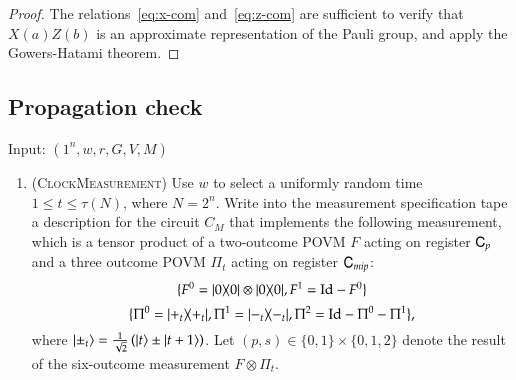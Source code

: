 \begin{proof}
The relations~\eqref{eq:x-com} and~\eqref{eq:z-com} are sufficient to verify that $X(a)Z(b)$ is an approximate representation of the Pauli group, and apply the Gowers-Hatami theorem.
\end{proof}



\subsection{Propagation check}
\label{sec:prop_check}

\vspace{10pt}
\begin{center}
\begin{mdframed}
    Input: $(1^n,w,r,G,V,M)$
	\begin{enumerate}
		\item (\textsc{ClockMeasurement}) Use $w$ to select a uniformly random time $1 \leq t \leq \tau(N)$, where $N = 2^n$. Write into the measurement specification tape a description for the circuit $C_M$ that implements the following measurement, which is a tensor product of a two-outcome POVM $F$ acting on register ${\textsf{C}}_p$ and a three outcome POVM $\Pi_t$ acting on register ${\textsf{C}}_{mip}$: 
\[
	\{F^0 = |0\rangle\! \langle 0| \otimes |0\rangle\! \langle 0|, F^1 = \mathop{\mathrm{Id}}\!\mathinner{} - F^0 \}
\]
\[
	\{ 	\Pi^0 = |+_t\rangle\! \langle +_t|, 
	\Pi^1 = |-_t\rangle\! \langle -_t|, 
	\Pi^2 = \mathop{\mathrm{Id}}\!\mathinner{} - \Pi^0 - \Pi^1 \},
\]	
where $|\pm_t\rangle = \frac{1}{\sqrt{2}} \left( |t\rangle \pm |t+1\rangle \right)$. Let $(p,s) \in \{0,1\} \times \{0,1,2\}$ denote the result of the six-outcome measurement $F \otimes \Pi_t$.


\end{enumerate}
\end{mdframed}
\end{center}
